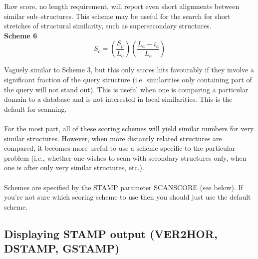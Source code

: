 Raw score, no length requirement, will report even short alignments between
similar sub--structures.  This scheme may be useful for the search for
short stretches of structural similarity, such as supersecondary structures.\\

{\bf Scheme 6}
\[
S_{c} =
\left(
\frac{S_{p}}{L_{a}}
\right)
\left(
\frac{L_{a}-i_{a}}{L_{a}}
\right)
\]

Vaguely similar to Scheme 3, but this only scores hits favourably
if they involve a significant fraction of the query structure
(i.e. similarities only containing part of the query will not
stand out).  This is useful when one is comparing a particular
domain to a database and is not interested in local similarities.
This is the default for scanning.\\
\\
For the most part, all of these scoring schemes will yield similar
numbers for very similar structures.  However, when more distantly
related structures are compared, it becomes more useful to use a
scheme specific to the particular problem (i.e., whether one wishes
to scan with secondary structures only, when one is after only
very similar structures, etc.).\\
\\
Schemes are specified by the STAMP parameter SCANSCORE (see below).  If 
you're not sure which scoring scheme to use then you should just
use the default scheme.

\subsection{Displaying STAMP output (VER2HOR, DSTAMP, GSTAMP)}

